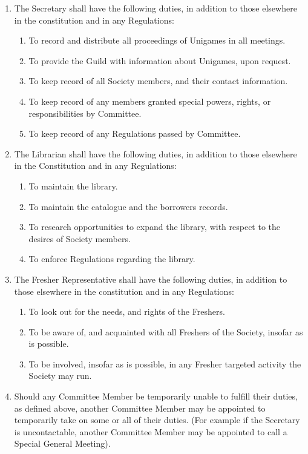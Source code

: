 \documentclass[a4paper]{article}
\begin{document}
\begin{enumerate}
    \item The Secretary shall have the following duties, in addition to those elsewhere in the constitution and in any Regulations:
          \begin{enumerate}
              \item To record and distribute all proceedings of Unigames in all meetings.
              \item To provide the Guild with information about Unigames, upon request.
              \item To keep record of all Society members, and their contact information.
              \item To keep record of any members granted special powers, rights, or responsibilities by Committee.
              \item To keep record of any Regulations passed by Committee.
          \end{enumerate}
    \item The Librarian shall have the following duties, in addition to those elsewhere in the Constitution and in any Regulations:
          \begin{enumerate}
              \item To maintain the library.
              \item To maintain the catalogue and the borrowers records.
              \item To research opportunities to expand the library, with respect to the desires of Society members.
              \item To enforce Regulations regarding the library.
          \end{enumerate}
    \item The Fresher Representative shall have the following duties, in addition to those elsewhere in the constitution and in any Regulations:
          \begin{enumerate}
              \item To look out for the needs, and rights of the Freshers.
              \item To be aware of, and acquainted with all Freshers of the Society, insofar as is possible.
              \item To be involved, insofar as is possible, in any Fresher targeted activity the Society may run.
          \end{enumerate}
    \item Should any Committee Member be temporarily unable to fulfill their duties, as defined above, another Committee Member may be appointed to temporarily take on some or all of their duties. (For example if the Secretary is uncontactable, another Committee Member may be appointed to call a Special General Meeting).
\end{enumerate}
\end{document}
